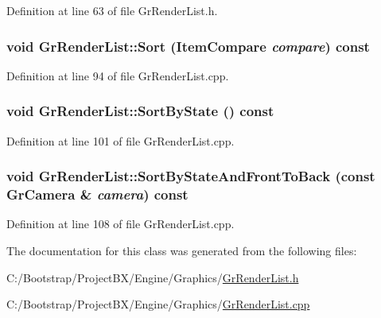 Definition at line 63 of file GrRenderList.h.\hypertarget{class_gr_render_list_6f56335d85f1e66ffcef3c202156ec0b}{
\subsubsection[{Sort}]{\setlength{\rightskip}{0pt plus 5cm}void GrRenderList::Sort ({\bf ItemCompare} {\em compare}) const}}
\label{class_gr_render_list_6f56335d85f1e66ffcef3c202156ec0b}




Definition at line 94 of file GrRenderList.cpp.\hypertarget{class_gr_render_list_33be395e2030cfadc8cee57f55e53b90}{
\subsubsection[{SortByState}]{\setlength{\rightskip}{0pt plus 5cm}void GrRenderList::SortByState () const}}
\label{class_gr_render_list_33be395e2030cfadc8cee57f55e53b90}




Definition at line 101 of file GrRenderList.cpp.\hypertarget{class_gr_render_list_a76c47e8612241e67759640fae1cadca}{
\subsubsection[{SortByStateAndFrontToBack}]{\setlength{\rightskip}{0pt plus 5cm}void GrRenderList::SortByStateAndFrontToBack (const {\bf GrCamera} \& {\em camera}) const}}
\label{class_gr_render_list_a76c47e8612241e67759640fae1cadca}




Definition at line 108 of file GrRenderList.cpp.

The documentation for this class was generated from the following files:\begin{CompactItemize}
\item 
C:/Bootstrap/ProjectBX/Engine/Graphics/\hyperlink{_gr_render_list_8h}{GrRenderList.h}\item 
C:/Bootstrap/ProjectBX/Engine/Graphics/\hyperlink{_gr_render_list_8cpp}{GrRenderList.cpp}\end{CompactItemize}
